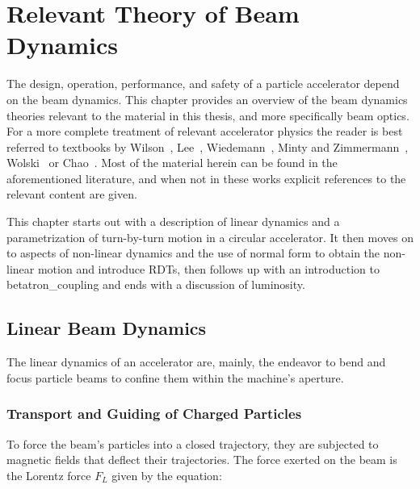 \chapter{Relevant Theory of Beam Dynamics}
\label{chapter:theory}

The design, operation, performance, and safety of a particle accelerator depend on the \gls{beam} dynamics.
This chapter provides an overview of the beam dynamics theories relevant to the material in this thesis, and more specifically beam \gls{optics}.
For a more complete treatment of relevant accelerator physics the reader is best referred to textbooks by Wilson~\cite{BOOK:Wilson:Introcution_Particle_Accelerators}, Lee~\cite{BOOK:Lee:Accelerator_physics}, Wiedemann~\cite{BOOK:Wiedemann:Particle_Accelerator_Physics}, Minty and Zimmermann~\cite{BOOK:Minty:Measurements_Control_Charged_Particle_Beams}, Wolski~\cite{BOOK:Wolski:Beam_dynamics} or Chao~\cite{BOOK:Chao:Handbook_Accelerator_Physics_Engineering, BOOK:Chao:Collective_instabilities}.
Most of the material herein can be found in the aforementioned literature, and when not in these works explicit references to the relevant content are given.

This chapter starts out with a description of linear dynamics and a parametrization of turn-by-turn motion in a circular accelerator.
It then moves on to aspects of non-linear dynamics and the use of normal form to obtain the non-linear motion and introduce \glspl{RDT}, then follows up with an introduction to \gls{betatron_coupling} and ends with a discussion of \gls{luminosity}.


\section{Linear Beam Dynamics}
\label{section:linear_beam_dynamics}

The linear dynamics of an accelerator are, mainly, the endeavor to bend and focus particle \glspl{beam} to confine them within the machine's aperture.

\subsection{Transport and Guiding of Charged Particles}
\label{subsection:transport_and_guiding_of_charged_particles}

To force the beam's particles into a closed trajectory, they are subjected to magnetic fields that deflect their trajectories.
The force exerted on the beam is the Lorentz force \(F_{L}\) given by the equation:

